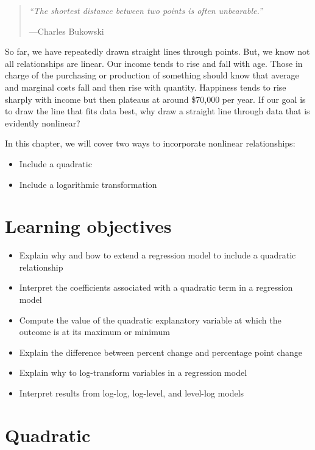 \documentclass[
]{book}
\providecommand{\tightlist}{%
  \setlength{\itemsep}{0pt}\setlength{\parskip}{0pt}}
\newenvironment{learncheck}%
{%
  \par\vspace{\baselineskip}\noindent 
  \color{Exercise}\begin{itshape}%
  \par\vspace{\baselineskip}\noindent\ignorespaces 
}%
{%
  \end{itshape}\ignorespacesafterend 
}
\begin{document}
\begin{quote}
\emph{``The shortest distance between two points is often unbearable.''}

---Charles Bukowski
\end{quote}

So far, we have repeatedly drawn straight lines through points. But, we know not all relationships are linear. Our income tends to rise and fall with age. Those in charge of the purchasing or production of something should know that average and marginal costs fall and then rise with quantity. Happiness tends to rise sharply with income but then plateaus at around \$70,000 per year. If our goal is to draw the line that fits data best, why draw a straight line through data that is evidently nonlinear?

In this chapter, we will cover two ways to incorporate nonlinear relationships:

\begin{itemize}
\tightlist
\item
  Include a quadratic
\item
  Include a logarithmic transformation
\end{itemize}

\hypertarget{lo8}{%
\section{Learning objectives}\label{lo8}}

\begin{learncheck}
\begin{itemize}
\tightlist
\item
  Explain why and how to extend a regression model to include a
  quadratic relationship
\item
  Interpret the coefficients associated with a quadratic term in a
  regression model
\item
  Compute the value of the quadratic explanatory variable at which the
  outcome is at its maximum or minimum
\item
  Explain the difference between percent change and percentage point
  change
\item
  Explain why to log-transform variables in a regression model
\item
  Interpret results from log-log, log-level, and level-log models
\end{itemize}
\end{learncheck}

\hypertarget{quadratic}{%
\section{Quadratic}\label{quadratic}}
\end{document}
